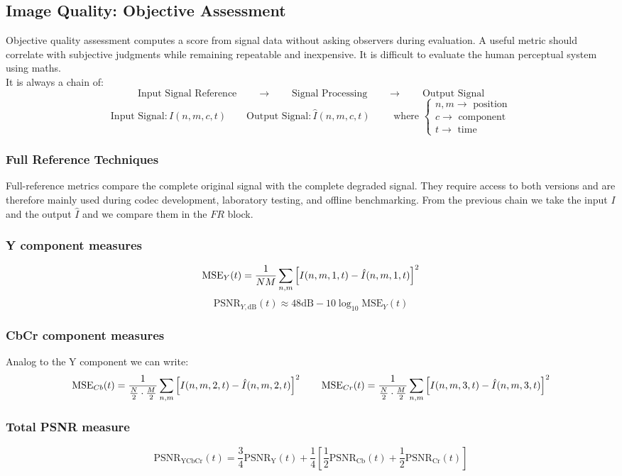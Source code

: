 \subsection{Image Quality: Objective Assessment}
Objective quality assessment computes a score from signal data without asking observers during evaluation. A useful metric should correlate with subjective judgments while remaining repeatable and inexpensive.
It is difficult to evaluate the human perceptual system using maths.\\
It is always a chain of:
$$\boxed{\text{Input Signal Reference}} \qquad \longrightarrow \qquad \boxed{\text{Signal Processing}} \qquad \longrightarrow \qquad \boxed{\text{Output Signal}}$$
$$\text{Input Signal}: I(n,m,c,t) \qquad \text{Output Signal}: \hat{I}(n,m,c,t) \qquad \text{ where }\begin{cases}
    n,m \to \text{ position}\\
    c \to \text{ component}\\
    t \to \text{ time}
\end{cases}$$
\subsubsection{Full Reference Techniques}
Full-reference metrics compare the complete original signal with the complete degraded signal. They require access to both versions and are therefore mainly used during codec development, laboratory testing, and offline benchmarking.
From the previous chain we take the input $I$ and the output $\hat{I}$ and we compare them in the $\boxed{FR}$ block.
\subsubsection{Y component measures}
$$\text{MSE}_Y(t) = \frac{1}{NM}\sum_{n,m}^{}\left[I(n,m,1,t) - \hat{I}(n,m,1,t)\right]^2$$
$$\text{PSNR}_{Y,\text{dB}}(t) \approx 48\text{dB} - 10\log_{10}\text{MSE}_Y(t)$$
\subsubsection{CbCr component measures}
Analog to the Y component we can write:
$$\text{MSE}_{Cb}(t) = \frac{1}{\frac{N}{2}\cdot\frac{M}{2}}\sum_{n,m}^{}\left[I(n,m,2,t) - \hat{I}(n,m,2,t)\right]^2 \qquad \text{MSE}_{Cr}(t) = \frac{1}{\frac{N}{2}\cdot\frac{M}{2}}\sum_{n,m}^{}\left[I(n,m,3,t) - \hat{I}(n,m,3,t)\right]^2$$
\subsubsection{Total PSNR measure}
$$\text{PSNR}_\text{YCbCr}(t) = \frac{3}{4}\text{PSNR}_\text{Y}(t) + \frac{1}{4}\left[\frac{1}{2}\text{PSNR}_\text{Cb}(t) + \frac{1}{2}\text{PSNR}_\text{Cr}(t)\right]$$
